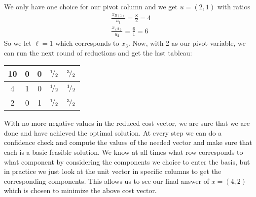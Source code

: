 \documentclass{article}
\begin{document}
\begin{jacklist}
\begin{center}
\begin{tabular}{|c|cccc|}
            \hline
        \end{tabular}
    \end{center} 
    We only have one choice for our pivot column and we get $u = (2,1)$ with ratios 
    \begin{align*}
        &\frac{x_{B(1)}}{u_1} = \frac{8}{2} = 4 \\
        &\frac{x_{(2)}}{u_2} = \frac{6}{1} = 6 
    \end{align*}
    So we let $\ell = 1$ which corresponds to $x_3$. Now, with 2 as our pivot variable, we can run the next round of reductions and 
    get the last tableau: 
    \begin{center}
        \begin{tabular}{|c|cccc|}
            \hline
            10&0&0&${}^{1}\!/_{2}$&${}^{3}\!/_{2}$ \\
            \hline
            4&1&0&${}^{1}\!/_{2}$&${}^{1}\!/_{2}$ \\
            2&0&1&${}^{1}\!/_{2}$&${}^{3}\!/_{2}$ \\
            \hline
        \end{tabular}
    \end{center}
    With no more negative values in the reduced cost vector, we are sure that we are done and have achieved the optimal solution. 
    At every step we can do a confidence check and compute the values of the needed vector and make sure that each is a basic feasible 
    solution. We know at all times what row corresponds to what component by considering the components we choice to enter the basis,
    but in practice we just look at the unit vector in specific columns to get the corresponding components. This allows us to see our 
    final answer of $x = (4,2)$ which is chosen to minimize the above cost vector. 
\end{jacklist}
\end{document}
